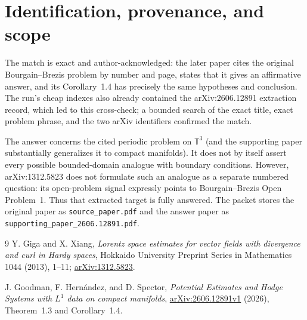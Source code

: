\documentclass[11pt]{article}
\begin{document}
\section*{Identification, provenance, and scope}

The match is exact and author-acknowledged: the later paper cites the original
Bourgain--Brezis problem by number and page, states that it gives an
affirmative answer, and its Corollary~1.4 has precisely the same hypotheses
and conclusion.  The run's cheap indexes also already contained the
arXiv:2606.12891 extraction record, which led to this cross-check; a bounded
search of the exact title, exact problem phrase, and the two arXiv identifiers
confirmed the match.

The answer concerns the cited periodic problem on $\mathbb T^3$ (and the
supporting paper substantially generalizes it to compact manifolds).  It does
not by itself assert every possible bounded-domain analogue with boundary
conditions.  However, arXiv:1312.5823 does not formulate such an analogue as
a separate numbered question: its open-problem signal expressly points to
Bourgain--Brezis Open Problem~1.  Thus that extracted target is fully answered.
The packet stores the original paper as \texttt{source\_paper.pdf} and the
answer paper as \texttt{supporting\_paper\_2606.12891.pdf}.

\begin{thebibliography}{9}
Y. Giga and X. Xiang,
\emph{Lorentz space estimates for vector fields with divergence and curl in
Hardy spaces}, Hokkaido University Preprint Series in Mathematics 1044
(2013), 1--11;
\href{https://arxiv.org/abs/1312.5823}{arXiv:1312.5823}.

J. Goodman, F. Hern\'andez, and D. Spector,
\emph{Potential Estimates and Hodge Systems with $L^1$ data on compact
manifolds},
\href{https://arxiv.org/abs/2606.12891}{arXiv:2606.12891v1} (2026),
Theorem~1.3 and Corollary~1.4.
\end{thebibliography}
\end{document}
